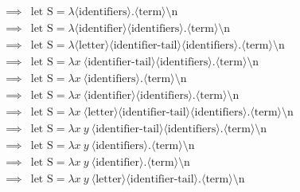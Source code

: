 \documentclass[12pt, a4paper, oneside]{memoir}
\begin{document}
\begin{align*}
    \implies{} & \text{let } \text{S} = \lambda \langle \text{identifiers} \rangle.\langle \text{term} \rangle \text{\textbackslash n}                                                                         \\
    \implies{} & \text{let } \text{S} = \lambda \langle \text{identifier} \rangle \langle \text{identifiers} \rangle.\langle \text{term} \rangle \text{\textbackslash n}                                       \\
    \implies{} & \text{let } \text{S} = \lambda \langle \text{letter} \rangle \langle \text{identifier-tail} \rangle \langle \text{identifiers} \rangle.\langle \text{term} \rangle \text{\textbackslash n}    \\
    \implies{} & \text{let } \text{S} = \lambda x\ \langle \text{identifier-tail} \rangle \langle \text{identifiers} \rangle.\langle \text{term} \rangle \text{\textbackslash n}                               \\
    \implies{} & \text{let } \text{S} = \lambda x\ \langle \text{identifiers} \rangle.\langle \text{term} \rangle \text{\textbackslash n}                                                                      \\
    \implies{} & \text{let } \text{S} = \lambda x\ \langle \text{identifier} \rangle \langle \text{identifiers} \rangle.\langle \text{term} \rangle \text{\textbackslash n}                                    \\
    \implies{} & \text{let } \text{S} = \lambda x\ \langle \text{letter} \rangle \langle \text{identifier-tail} \rangle \langle \text{identifiers} \rangle.\langle \text{term} \rangle \text{\textbackslash n} \\
    \implies{} & \text{let } \text{S} = \lambda x\ y\ \langle \text{identifier-tail} \rangle \langle \text{identifiers} \rangle.\langle \text{term} \rangle \text{\textbackslash n}                            \\
    \implies{} & \text{let } \text{S} = \lambda x\ y\ \langle \text{identifiers} \rangle.\langle \text{term} \rangle \text{\textbackslash n}                                                                   \\
    \implies{} & \text{let } \text{S} = \lambda x\ y\ \langle \text{identifier} \rangle.\langle \text{term} \rangle \text{\textbackslash n}                                                                    \\
    \implies{} & \text{let } \text{S} = \lambda x\ y\ \langle \text{letter} \rangle \langle \text{identifier-tail} \rangle.\langle \text{term} \rangle \text{\textbackslash n}                                 \\

\end{align*}
\end{document}
